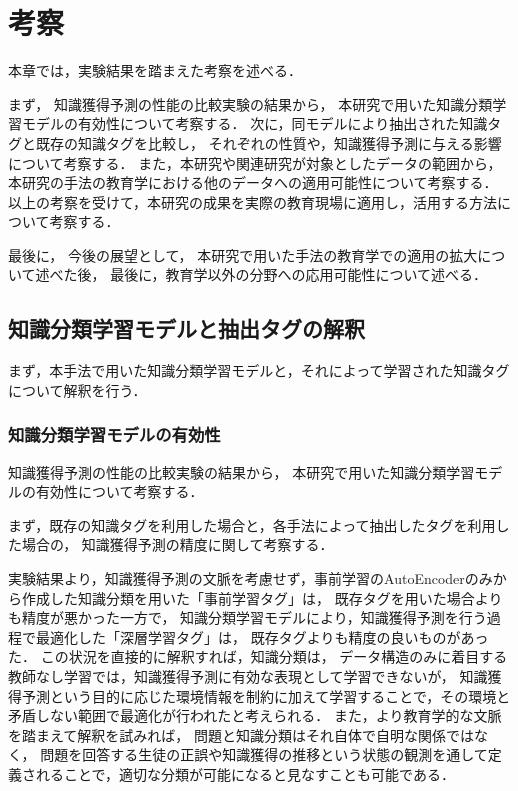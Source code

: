 \chapter{考察}
\label{chap:discussion}
\fancyhf{}
\rhead{\thepage}
\cfoot{\thepage}

本章では，実験結果を踏まえた考察を述べる．

まず，
知識獲得予測の性能の比較実験の結果から，
本研究で用いた知識分類学習モデルの有効性について考察する．
次に，同モデルにより抽出された知識タグと既存の知識タグを比較し，
それぞれの性質や，知識獲得予測に与える影響について考察する．
また，本研究や関連研究が対象としたデータの範囲から，
本研究の手法の教育学における他のデータへの適用可能性について考察する．
以上の考察を受けて，本研究の成果を実際の教育現場に適用し，活用する方法について考察する．

最後に，
今後の展望として，
本研究で用いた手法の教育学での適用の拡大について述べた後，
最後に，教育学以外の分野への応用可能性について述べる．

\section{知識分類学習モデルと抽出タグの解釈}
まず，本手法で用いた知識分類学習モデルと，それによって学習された知識タグについて解釈を行う．



\subsection{知識分類学習モデルの有効性}
知識獲得予測の性能の比較実験の結果から，
本研究で用いた知識分類学習モデルの有効性について考察する．


まず，既存の知識タグを利用した場合と，各手法によって抽出したタグを利用した場合の，
知識獲得予測の精度に関して考察する．

実験結果より，知識獲得予測の文脈を考慮せず，事前学習のAutoEncoderのみから作成した知識分類を用いた「事前学習タグ」は，
既存タグを用いた場合よりも精度が悪かった一方で，
知識分類学習モデルにより，知識獲得予測を行う過程で最適化した「深層学習タグ」は，
既存タグよりも精度の良いものがあった．
この状況を直接的に解釈すれば，知識分類は，
データ構造のみに着目する教師なし学習では，知識獲得予測に有効な表現として学習できないが，
知識獲得予測という目的に応じた環境情報を制約に加えて学習することで，その環境と矛盾しない範囲で最適化が行われたと考えられる．
また，より教育学的な文脈を踏まえて解釈を試みれば，
問題と知識分類はそれ自体で自明な関係ではなく，
問題を回答する生徒の正誤や知識獲得の推移という状態の観測を通して定義されることで，適切な分類が可能になると見なすことも可能である．

